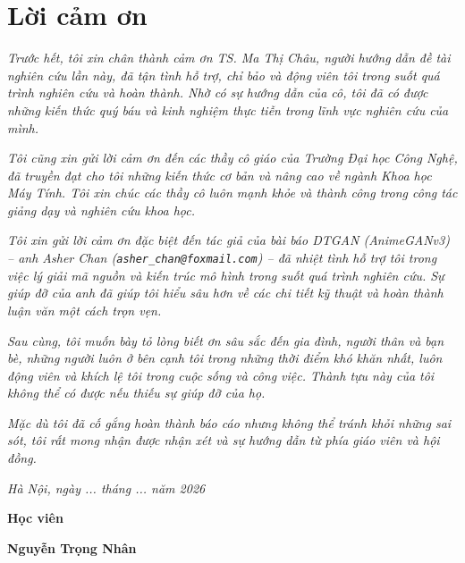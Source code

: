 \clearpage
{}

\chapter*{Lời cảm ơn}

\textit{Trước hết, tôi xin chân thành cảm ơn TS. Ma Thị Châu, người hướng dẫn đề tài nghiên cứu lần này, đã tận tình hỗ trợ, chỉ bảo và động viên tôi trong suốt quá trình nghiên cứu và hoàn thành. Nhờ có sự hướng dẫn của cô, tôi đã có được những kiến thức quý báu và kinh nghiệm thực tiễn trong lĩnh vực nghiên cứu của mình.}

\textit{Tôi cũng xin gửi lời cảm ơn đến các thầy cô giáo của Trường Đại học Công Nghệ, đã truyền đạt cho tôi những kiến thức cơ bản và nâng cao về ngành Khoa học Máy Tính. Tôi xin chúc các thầy cô luôn mạnh khỏe và thành công trong công tác giảng dạy và nghiên cứu khoa học.}

\textit{Tôi xin gửi lời cảm ơn đặc biệt đến tác giả của bài báo DTGAN (AnimeGANv3) -- anh Asher Chan (\texttt{asher\_chan@foxmail.com}) -- đã nhiệt tình hỗ trợ tôi trong việc lý giải mã nguồn và kiến trúc mô hình trong suốt quá trình nghiên cứu. Sự giúp đỡ của anh đã giúp tôi hiểu sâu hơn về các chi tiết kỹ thuật và hoàn thành luận văn một cách trọn vẹn.}

\textit{Sau cùng, tôi muốn bày tỏ lòng biết ơn sâu sắc đến gia đình, người thân và bạn bè, những người luôn ở bên cạnh tôi trong những thời điểm khó khăn nhất, luôn động viên và khích lệ tôi trong cuộc sống và công việc. Thành tựu này của tôi không thể có được nếu thiếu sự giúp đỡ của họ.}

\textit{Mặc dù tôi đã cố gắng hoàn thành báo cáo nhưng không thể tránh khỏi những sai sót, tôi rất mong nhận được nhận xét và sự hướng dẫn từ phía giáo viên và hội đồng.}

\vspace{1cm}
\hspace{7cm}\textit{Hà Nội, ngày ... tháng ... năm 2026}

\hspace{9.4cm}\textbf{Học viên}
\vspace{2.5cm}


\hspace{9.3cm}\textbf{Nguyễn Trọng Nhân}

